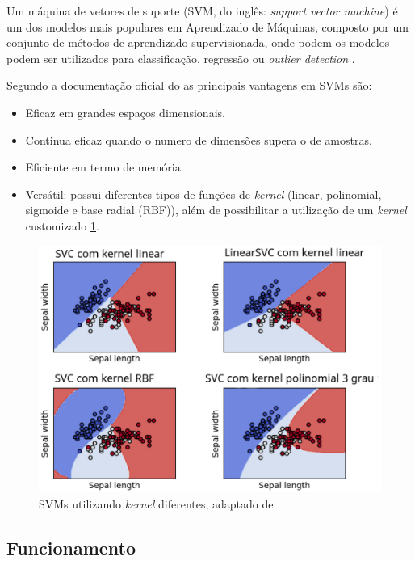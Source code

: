 Um máquina de vetores de suporte (SVM, do inglês: \textit{support vector machine}) é um dos modelos mais populares em Aprendizado de Máquinas, composto por um conjunto de métodos de aprendizado supervisionada, onde podem os modelos podem ser utilizados para classificação, regressão ou \textit{outlier detection} \cite{scikit-learn}.

Segundo a documentação oficial do  as principais vantagens em SVMs são:

\begin{itemize}
    \item Eficaz em grandes espaços dimensionais.
    \item Continua eficaz quando o numero de dimensões supera o de amostras.
    \item Eficiente em termo de memória.
    \item Versátil: possui diferentes tipos de funções de \textit{kernel} (linear, polinomial, sigmoide e base radial (RBF)), além de possibilitar a utilização de um \textit{kernel} customizado \ref{svmkernel}.
\end{itemize}

\begin{figure}[!htb]
    \centering
     \includegraphics[width=1\textwidth]{figuras/svmkernel.eps}
     \caption{SVMs utilizando \textit{kernel} diferentes, adaptado de }
     \label{svmkernel}
 \end{figure}

 \subsection{Funcionamento}

 